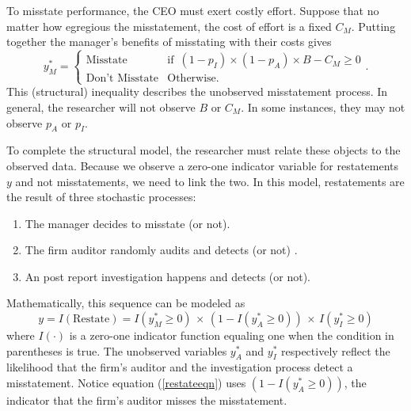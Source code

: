 To misstate performance, the CEO must exert costly effort. Suppose that no matter how 
egregious the misstatement, the cost of effort is a fixed $C_M$. Putting together the manager's 
benefits of misstating with their costs gives
\begin{equation}\label{bencost}
y_M^* = \begin{cases}\mbox{Misstate} & \mbox{if }\, (1-p_I) \times (1-p_A) \times B - C_M \ge 0\\
\mbox{Don't Misstate} & \mbox{Otherwise}.\end{cases}.\end{equation}
This (structural) inequality describes the unobserved misstatement process. In general, the researcher
will not observe $B$ or $C_M$. In some instances, they may not observe $p_A$ or $p_I$.

To complete the structural model, the researcher must relate these objects to the observed data.
Because we observe a zero-one indicator variable for restatements $y$ and not misstatements,
we need to link the two. In this model, restatements are the result of three stochastic processes:

\begin{enumerate}
\item The manager decides to misstate (or not).
\item The firm auditor randomly audits and detects (or not) .
\item An post report investigation happens and detects (or not).
\end{enumerate}

Mathematically, this sequence can be modeled as
\begin{equation}\label{restateeqn}
 y = I(\mbox{Restate}) = I(y^*_M \ge 0) \, \times\, (1 - I(y^*_A \ge 0)) \, \times\, I(y^*_I \ge 0)
\end{equation}
where $I(\cdot)$ is a zero-one indicator function equaling one when the condition in parentheses is true.
The unobserved variables $y^*_A$ and $y^*_I$ respectively reflect the likelihood that the firm's
auditor and the investigation process detect a misstatement. Notice equation (\ref{restateeqn})
uses $(1 - I(y^*_A \ge 0))$, the indicator that the firm's auditor misses the misstatement.

